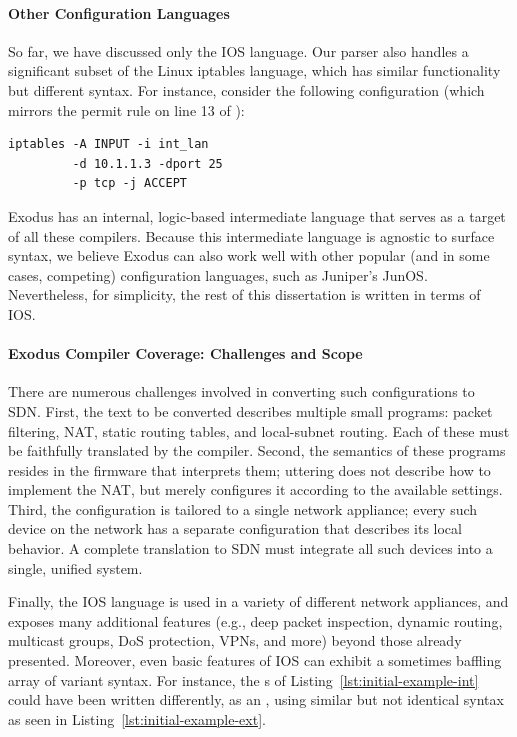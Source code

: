 \paragraph{Other Configuration Languages}

So far, we have discussed only the IOS language. Our parser also
handles a significant subset of the Linux iptables language, which has
similar functionality but different syntax. For instance, consider the
following configuration (which mirrors the permit rule on line 13 of ):

\begin{lstlisting}[label=lst:iptables,language=IOS]
iptables -A INPUT -i int_lan 
         -d 10.1.1.3 -dport 25 
         -p tcp -j ACCEPT
\end{lstlisting}

\noindent
Exodus has an internal, logic-based intermediate language that serves
as a target of all these compilers. Because this intermediate language
is agnostic to surface syntax, we believe Exodus can also work
well with other popular (and in some cases, competing) configuration
languages, such as Juniper's JunOS. Nevertheless, for simplicity, the
rest of this dissertation is written in terms of IOS.

\paragraph{Exodus Compiler Coverage: Challenges and Scope}

There are numerous challenges involved in converting such configurations to
SDN. First, the text to be converted describes multiple small programs: packet
filtering, NAT, static routing tables, and local-subnet routing. Each of these must
be faithfully translated by the compiler. Second, the semantics of these
programs resides in the firmware that interprets them; uttering  does not describe how to implement the NAT, but merely configures it
according to the available settings. Third, the configuration is tailored to
a single network appliance; every such device on the network has a separate
configuration that describes its local behavior. A complete translation to SDN must
integrate all such devices into a single, unified system.

Finally, the IOS language is
used in a variety of different network appliances, and exposes many additional
features (e.g., deep packet inspection, dynamic routing, multicast groups,
DoS protection, VPNs, and more) beyond those already presented.
Moreover, even basic features of IOS can exhibit a
sometimes baffling array of variant syntax. For instance, the s
of Listing~\ref{lst:initial-example-int} could have been written
differently, as an , using similar but not identical
syntax as seen in Listing~\ref{lst:initial-example-ext}.

